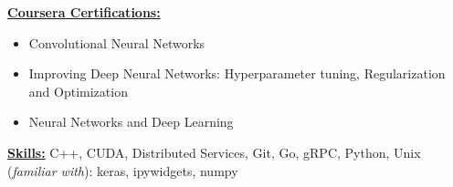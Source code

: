 \documentclass[11pt]{ltxdoc}
\begin{document}
	\textbf{\underline{Coursera Certifications:}}
		\begin{itemize}
		  \item Convolutional Neural Networks
		  \item Improving Deep Neural Networks: Hyperparameter tuning, Regularization and Optimization
		  \item Neural Networks and Deep Learning
		\end{itemize}
	
\textbf{\underline{Skills:}} C++, CUDA, Distributed Services, Git, Go, gRPC, Python, Unix \\
(\emph{familiar with}): keras, ipywidgets, numpy
\end{document}
